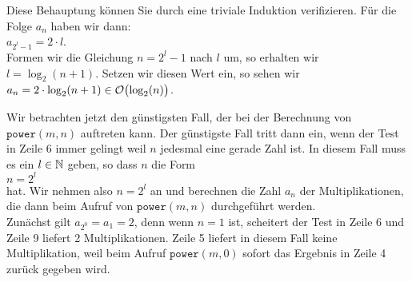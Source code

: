 Diese Behauptung k\"onnen Sie durch eine triviale Induktion verifizieren. 
F\"ur die Folge $a_n$ haben wir dann: \\[0.1cm]
\hspace*{1.3cm} $a_{2^l-1} = 2 \cdot l$. \\[0.1cm]
Formen wir die Gleichung $n = 2^l - 1$ nach $l$ um, so erhalten wir $l =
\log_2(n+1)$. Setzen wir diesen Wert ein, so sehen wir \\[0.1cm]
\hspace*{1.3cm} $a_n = 2 \cdot \log_2(n+1) \in \mathcal{O}\bigl(\log_2(n)\bigr)$.
\vspace*{0.3cm}

Wir betrachten jetzt den g\"unstigsten Fall, der bei der Berechnung von
$\mathtt{power}(m,n)$ auftreten kann. Der g\"unstigste Fall tritt dann ein, wenn 
der Test in Zeile 6 immer gelingt weil $n$ jedesmal eine gerade Zahl ist.  In diesem Fall muss
es ein $l\in {\mathbb N}$ geben, so dass $n$ die Form \\[0.1cm]
\hspace*{1.3cm} $n = 2^l$ \\[0.1cm]
hat. Wir nehmen also $n = 2^l$ an und berechnen die Zahl $a_n$ der Multiplikationen, die
dann beim
Aufruf von $\mathtt{power}(m,n)$ durchgef\"uhrt werden. \\[0.1cm]
Zun\"achst gilt $a_{2^0} = a_1 = 2$, denn wenn $n = 1$  ist, scheitert der Test in Zeile 6 und Zeile 9
liefert 2 Multiplikationen.  Zeile 5 liefert in diesem Fall keine Multiplikation, weil
beim Aufruf $\mathtt{power}(m,0)$ sofort das Ergebnis in Zeile 4 zur\"uck gegeben wird.

